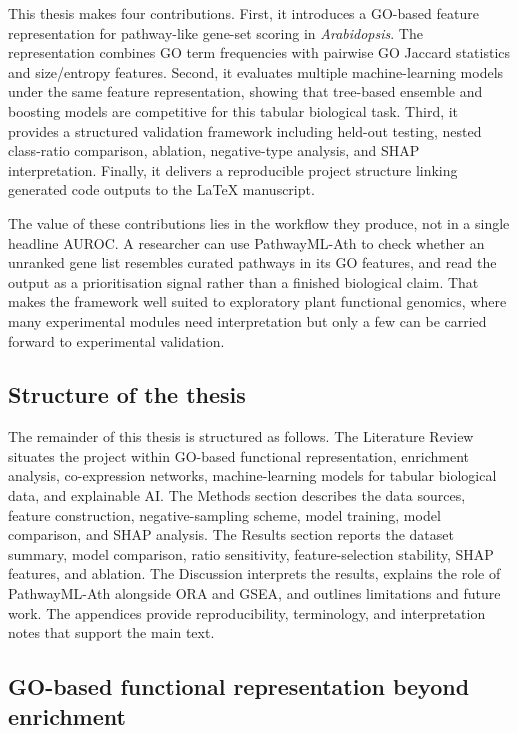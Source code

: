 \documentclass[12pt,twoside]{article}
\begin{document}
This thesis makes four contributions. First, it introduces a GO-based feature representation for pathway-like gene-set scoring in \textit{Arabidopsis}. The representation combines GO term frequencies with pairwise GO Jaccard statistics and size/entropy features. Second, it evaluates multiple machine-learning models under the same feature representation, showing that tree-based ensemble and boosting models are competitive for this tabular biological task. Third, it provides a structured validation framework including held-out testing, nested class-ratio comparison, ablation, negative-type analysis, and SHAP interpretation. Finally, it delivers a reproducible project structure linking generated code outputs to the LaTeX manuscript.

The value of these contributions lies in the workflow they produce, not in a single headline AUROC. A researcher can use PathwayML-Ath to check whether an unranked gene list resembles curated pathways in its GO features, and read the output as a prioritisation signal rather than a finished biological claim. That makes the framework well suited to exploratory plant functional genomics, where many experimental modules need interpretation but only a few can be carried forward to experimental validation.

\subsection{Structure of the thesis}
\label{sec:bg_structure}

The remainder of this thesis is structured as follows. The Literature Review situates the project within GO-based functional representation, enrichment analysis, co-expression networks, machine-learning models for tabular biological data, and explainable AI. The Methods section describes the data sources, feature construction, negative-sampling scheme, model training, model comparison, and SHAP analysis. The Results section reports the dataset summary, model comparison, ratio sensitivity, feature-selection stability, SHAP features, and ablation. The Discussion interprets the results, explains the role of PathwayML-Ath alongside ORA and GSEA, and outlines limitations and future work. The appendices provide reproducibility, terminology, and interpretation notes that support the main text.

\subsection{GO-based functional representation beyond enrichment}
\label{sec:lit_go_extended}
\end{document}
